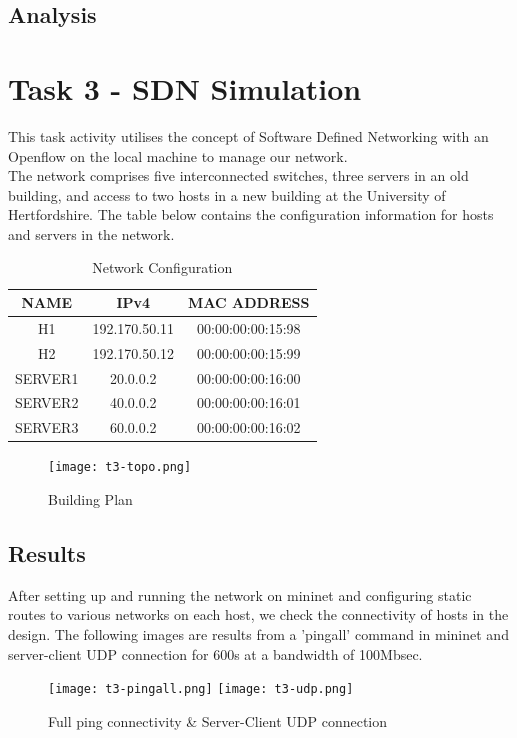 \documentclass{article}
\begin{document}
\subsection{Analysis}

\newpage
\section{Task 3 - SDN Simulation}
    This task activity utilises the concept of Software Defined Networking with an Openflow on the local machine to manage our network. \\The network comprises five interconnected switches, three servers in an old building, and access to two hosts in a new building at the University of Hertfordshire. The table below contains the configuration information for hosts and servers in the network.
    \begin{table}[h]
        \centering
        \begin{tabular}{|c|c|c|}
            \hline
            NAME & IPv4 & MAC ADDRESS \\
            \hline
            H1 & 192.170.50.11 & 00:00:00:00:15:98 \\
            H2 & 192.170.50.12 & 00:00:00:00:15:99 \\
            SERVER1 & 20.0.0.2 & 00:00:00:00:16:00 \\
            SERVER2 & 40.0.0.2 & 00:00:00:00:16:01 \\
            SERVER3 & 60.0.0.2 & 00:00:00:00:16:02 \\
            \hline
        \end{tabular}
        \caption{Network Configuration}
        \label{tab:4}
    \end{table}

    \begin{figure}[h]
        \centering
        \texttt{[image: t3-topo.png]}
        \caption{Building Plan}
        \label{fig:floor-plan}
    \end{figure}
    \newpage
    \subsection{Results}
        After setting up and running the network on mininet and configuring static routes to various networks on each host, we check the connectivity of hosts in the design. The following images are results from a 'pingall' command in mininet and server-client UDP connection for 600s at a bandwidth of 100Mbsec.
        \begin{figure}[h]
            \centering
            \texttt{[image: t3-pingall.png]}
            \texttt{[image: t3-udp.png]}
            \caption{Full ping connectivity \& Server-Client UDP connection}
            \label{fig:task3}
        \end{figure}
\end{document}
